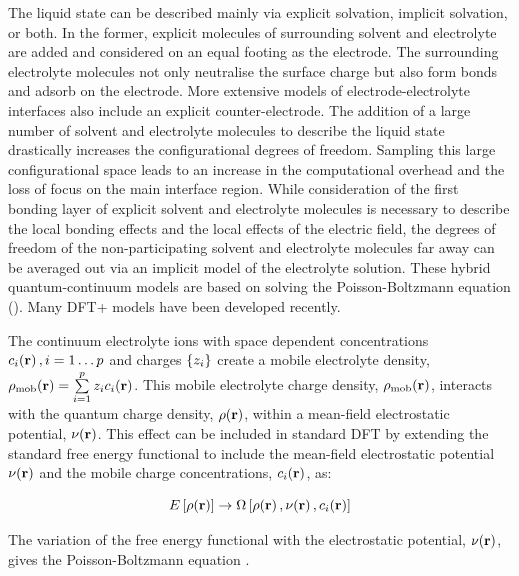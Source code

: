\documentclass[../main.tex]{subfiles}
\begin{document}
The liquid state can be described mainly via explicit solvation,\cite{Hansen2016} implicit solvation,\cite{Sakong2015} or both.\cite{Skyner2015} In the former, explicit molecules of surrounding solvent and electrolyte are added and considered on an equal footing as the electrode. The surrounding electrolyte molecules not only neutralise the surface charge but also form bonds and adsorb on the electrode.\cite{Kang2011} More extensive models of electrode-electrolyte interfaces also include an explicit counter-electrode.\cite{Dufils2019, Jorn2013} The addition of a large number of solvent and electrolyte molecules to describe the liquid state drastically increases the configurational degrees of freedom. Sampling this large configurational space leads to an increase in the computational overhead and the loss of focus on the main interface region. While consideration of the first bonding layer of explicit solvent and electrolyte molecules is necessary to describe the local bonding effects and the local effects of the electric field,\cite{Zhang2020} the degrees of freedom of the non-participating solvent and electrolyte molecules far away can be averaged out via an implicit model of the electrolyte solution.\cite{Cramer1999, Tomasi2005} These hybrid quantum-continuum models are based on solving the Poisson-Boltzmann equation (\pbe).\cite{Grochowski2008} Many DFT+\pbe{} models have been developed recently.\cite{Jinnouchi2008, Gunceler2013, Ringe2016, Nattino2019, Melander2019, Stein2019, DLMG2018, Dziedzic2020, neutralization-paper}

The continuum electrolyte ions with space dependent concentrations $c_i\!\left(\mathbf{r}\right), i=1\dots p$ and charges $\{z_i\}$ create a mobile electrolyte density, $\rho_{\textrm{mob}}\!\left(\mathbf{r}\right)=\sum\limits_{i=1}^pz_ic_i\!\left(\mathbf{r}\right)$. This mobile electrolyte charge density, $\rho_{\textrm{mob}}\!\left(\mathbf{r}\right)$,  interacts with the quantum charge density, $\rho\!\left(\mathbf{r}\right)$, within a mean-field electrostatic potential, $\nu\!\left(\mathbf{r}\right)$. This effect can be included in standard DFT by extending the standard free energy functional to include the mean-field electrostatic potential $\nu\!\left(\mathbf{r}\right)$ and the mobile charge concentrations, $c_i\!\left(\mathbf{r}\right)$, as:\cite{Dziedzic2020}

\begin{equation}
    E\left[\rho\!\left(\mathbf{r}\right)\right]\rightarrow \Omega\left[\rho\!\left(\mathbf{r}\right),\nu\!\left(\mathbf{r}\right),c_i\!\left(\mathbf{r}\right)\right]
\end{equation}

The variation of the free energy functional with the electrostatic potential, $\nu\!\left(\mathbf{r}\right)$, gives the Poisson-Boltzmann equation \pbe{}.
\end{document}
